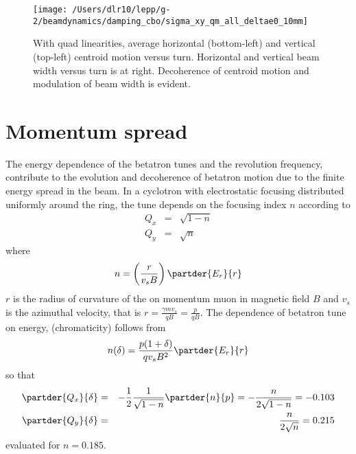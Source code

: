 \documentclass[10pt]{article}
\begin{document}
\begin{figure}[htbp] %
   \centering
   \texttt{[image: /Users/dlr10/lepp/g-2/beamdynamics/damping\_cbo/sigma\_xy\_qm\_all\_deltae0\_10mm]} 
   \caption{ With quad linearities, average horizontal (bottom-left) and vertical (top-left) centroid motion versus turn.
Horizontal and vertical beam width versus turn is at right. Decoherence of centroid motion and modulation of beam width is evident.\label{dist_mp}}
\end{figure}
\newpage
\section{Momentum spread}
The energy dependence of the betatron tunes and the revolution frequency, contribute to the evolution 
and decoherence of betatron motion due to the finite energy spread in the beam.
In a cyclotron with electrostatic focusing
distributed uniformly around the ring,
the tune depends on the focusing index $n$ according to
\begin{eqnarray*}
Q_x &=& \sqrt{1-n}\\
Q_y &=& \sqrt{n}
\end{eqnarray*}
where $$n =\left(\frac{r}{v_s B}\right)\partder{E_r}{r}$$
$r$ is the radius of curvature of the on momentum muon in magnetic field $B$ and $v_s$ is the azimuthal
velocity, that is $r = \frac{\gamma m v_s}{q B} = \frac{p}{qB}$.
The dependence of betatron tune on energy, (chromaticity) follows from
$$n(\delta) = \frac{p(1+\delta)}{qv_s B^2}\partder{E_r}{r}$$ so
that
\begin{eqnarray*}
\partder{Q_x}{\delta} &=&-\frac{1}{2}\frac{1}{ \sqrt{1-n}}\partder{n}{p} = -\frac{n}{2\sqrt{1-n}} =-0.103\\
\partder{Q_y}{\delta} &=& \frac{n}{2\sqrt{n}} = 0.215 
\end{eqnarray*}
evaluated for $n=0.185$.
\end{document}

